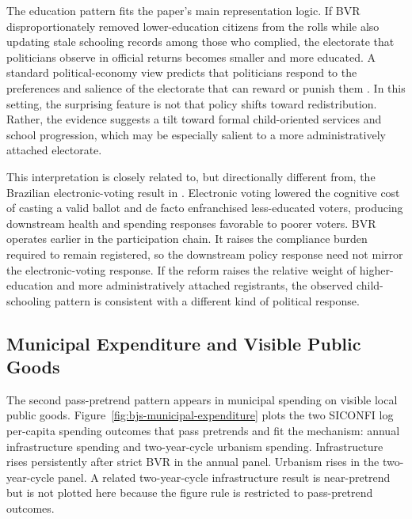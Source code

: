 The education pattern fits the paper's main representation logic. If BVR disproportionately removed lower-education citizens from the rolls while also updating stale schooling records among those who complied, the electorate that politicians observe in official returns becomes smaller and more educated. A standard political-economy view predicts that politicians respond to the preferences and salience of the electorate that can reward or punish them \citep{Meltzer1981RationalTheoryThe, besleyCoate1997}. In this setting, the surprising feature is not that policy shifts toward redistribution. Rather, the evidence suggests a tilt toward formal child-oriented services and school progression, which may be especially salient to a more administratively attached electorate.

This interpretation is closely related to, but directionally different from, the Brazilian electronic-voting result in \citet{Fujiwara2015VotingTechnoloPolitica}. Electronic voting lowered the cognitive cost of casting a valid ballot and de facto enfranchised less-educated voters, producing downstream health and spending responses favorable to poorer voters. BVR operates earlier in the participation chain. It raises the compliance burden required to remain registered, so the downstream policy response need not mirror the electronic-voting response. If the reform raises the relative weight of higher-education and more administratively attached registrants, the observed child-schooling pattern is consistent with a different kind of political response.

\subsection{Municipal Expenditure and Visible Public Goods}
\label{ssec:policy-expenditure}

The second pass-pretrend pattern appears in municipal spending on visible local public goods. Figure~\hyperref[fig:bjs-municipal-expenditure]{\ref*{fig:bjs-municipal-expenditure}} plots the two SICONFI log per-capita spending outcomes that pass pretrends and fit the mechanism: annual infrastructure spending and two-year-cycle urbanism spending. Infrastructure rises persistently after strict BVR in the annual panel. Urbanism rises in the two-year-cycle panel. A related two-year-cycle infrastructure result is near-pretrend but is not plotted here because the figure rule is restricted to pass-pretrend outcomes.

